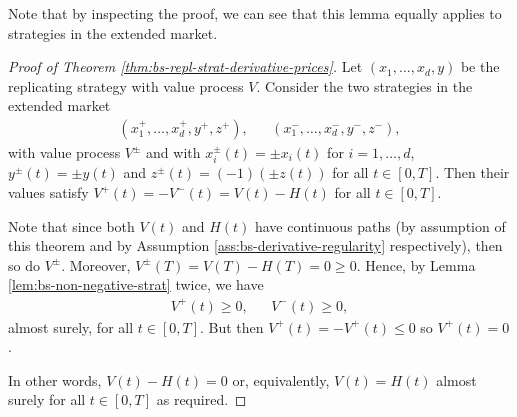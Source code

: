 \documentclass[english]{article}
\numberwithin{equation}{section}
\numberwithin{figure}{section}
\theoremstyle{bolddescit}
\theoremstyle{definition}
\theoremstyle{definition}
\theoremstyle{plain}
\theoremstyle{plain}
\theoremstyle{bolddesc}
\theoremstyle{plain}
\theoremstyle{remark}
\begin{document}
Note that by inspecting the proof, we can see that this lemma equally applies to strategies in the extended market.

\begin{proof}[Proof of Theorem \ref{thm:bs-repl-strat-derivative-prices}]
  Let $(x_1,\ldots,x_d,y)$ be the replicating strategy with value process $V$. Consider the two strategies in the extended market
  \begin{align*}
    (x_1^+,\ldots,x_d^+,y^+,z^+), && (x_1^-,\ldots,x_d^-,y^-,z^-),
  \end{align*}
  with value process $V^\pm$ and with $x_i^\pm(t) = \pm x_i(t)$ for $i=1,\ldots,d$, $y^\pm(t) = \pm y(t)$ and $z^\pm(t) = (-1) (\pm z(t))$ for all $t \in [0,T]$.  Then their values satisfy $V^+(t) = - V^-(t) = V(t) - H(t)$ for all $t \in [0,T]$.

  Note that since both $V(t)$ and $H(t)$ have continuous paths (by assumption of this theorem and by Assumption \ref{ass:bs-derivative-regularity} respectively), then so do $V^\pm$. Moreover, $V^\pm(T) = V(T) - H(T) = 0 \ge 0$. Hence, by Lemma \ref{lem:bs-non-negative-strat} twice, we have
  \begin{align*}
    V^+(t) \ge 0, && V^-(t) \ge 0,
  \end{align*}
  almost surely, for all $t \in [0,T]$. But then $V^+(t) = - V^+(t) \le 0$ so $V^+(t) = 0$.

  In other words, $V(t) - H(t) = 0$ or, equivalently, $V(t) = H(t)$ almost surely for all $t \in [0,T]$ as required.
\end{proof}
\end{document}
